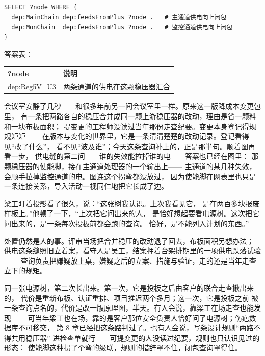\nopagebreak[4]
\begin{codebox}
\begin{Verbatim}[fontsize=\small,breaklines=true,breakanywhere=true,breaksymbolleft={},breaksymbolright={}]
SELECT ?node WHERE {
  dep:MainChain dep:feedsFromPlus ?node .   # 主通道供电向上闭包
  dep:MonChain  dep:feedsFromPlus ?node .   # 监控通道供电向上闭包
}
\end{Verbatim}
\end{codebox}

答案表：

\begin{center}
\begingroup\small
\setlength{\tabcolsep}{4pt}
\begin{tabularx}{\linewidth}{@{}XX@{}}
\toprule
?node & 说明 \\
\midrule
dep:Reg5V\_\allowbreak{}U3 & 两条通道的供电在这颗稳压器汇合 \\
\bottomrule
\end{tabularx}
\endgroup
\end{center}

会议室安静了几秒——和很多年前另一间会议室里一样。原来这一版降成本变更包里，
有一条把两路各自的稳压合并成同一颗上游稳压器的改动，理由是省一颗料和一块布板面积；
提变更的工程师没读过当年那份走查纪要。变更本身登记得规规矩矩——
在版本与变化的世界里，它是一条清清楚楚的改动记录。登记看得见“改了什么”，
看不见“波及谁”；今天这条查询补上的，正是那半句。顺着图再看一步，
供电缝的第二问——谁的失效能拉掉谁的电——答案也已经在图里：
那颗稳压器的使能脚，接在主通道处理器的一个输出上——
主通道的某几种失效，会顺手拉掉监控通道的电。图连这个拐弯都没放过，
因为使能脚在网表里也只是一条连接关系，导入活动一视同仁地把它长成了边。

梁工盯着投影看了很久，说：“这张树我认识。上次我看见它，
是在两百多块报废样板上。”他顿了一下，“上次把它问出来的人，
是恰好想起要看电源树。这次把它问出来的，是一条每次投板前都会跑的查询。
恰好，是不能列入计划的东西。”

处置仍然是人的事。评审当场把合并稳压的改动退了回去，布板面积另想办法；
供电这条缝照旧立着案，看守人是吴工，结案押着台架排期里的一项供电跌落试验——
查询负责把嫌疑放上桌，嫌疑之后的立案、措施与验证，走的还是当年走查立下的规矩。

同一张电源树，第二次长出来。第一次，它是投板之后由客户的联合走查揪出来的，
代价是重新布板、认证重排、项目推迟两个多月；这一次，它是投板之前
被一条查询点名的，代价是改一版原理图，半天。有人会说，靠梁工在场走查也能发现——
可当年梁工也在场，靠的是客户那位安全负责人恰好问了电源树；伤疤数据库不可移交，
第 8 章已经把这条路判过了。也有人会说，写条设计规则“两路不得共用稳压器”
进检查单就行——可提变更的人没读过纪要，规则也只认识见过的形态：
使能脚这种拐了个弯的级联，规则的措辞罩不住，闭包查询罩得住。

